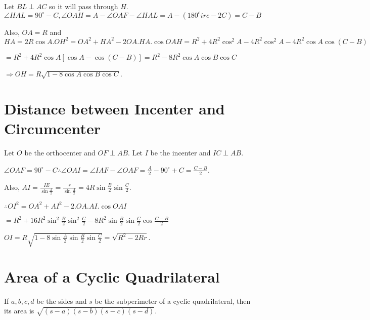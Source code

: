 Let $BL\perp AC$ so it will pass through $H$. $\angle HAL = 90^\circ - C, \angle OAH = A - \angle OAF - \angle HAL = A - (180^circ
- 2C) = C - B$

Also, $OA = R$ and $HA = 2R\cos A. OH^2 = OA^2 + HA^2 - 2OA.HA.\cos OAH = R^2 + 4R^2\cos^2A - 4R^2\cos^2A - 4R^2\cos A\cos(C - B)$

$= R^2 + 4R^2\cos A[\cos A - \cos(C - B)] = R^2 - 8R^2\cos A\cos B\cos C$

$\Rightarrow OH = R\sqrt{1 - 8\cos A\cos B\cos C}$.

\section{Distance between Incenter and Circumcenter}
Let $O$ be the orthocenter and $OF\perp AB$. Let $I$ be the incenter and $IC\perp AB$.

$\angle OAF = 90^\circ - C \therefore \angle OAI = \angle IAF - \angle OAF = \frac{A}{2} - 90^\circ + C = \frac{C - B}{2}$.

Also, $AI = \frac{IE}{\sin\frac{A}{2}} = \frac{r}{\sin\frac{A}{2}} = 4R\sin\frac{B}{2}\sin\frac{C}{2}$.

$\therefore OI^2 = OA^2 + AI^2 - 2.OA.AI.\cos OAI$

$ = R^2 + 16R^2\sin^2\frac{B}{2}\sin^2\frac{C}{2} - 8R^2\sin\frac{B}{2}\sin\frac{C}{2}\cos\frac{C - B}{2}$

$OI = R\sqrt{1 - 8\sin\frac{A}{2}\sin\frac{B}{2}\sin\frac{C}{2}} = \sqrt{R^2 - 2Rr}$.

\section{Area of a Cyclic Quadrilateral}
\starttheorem
{}
  If $a, b, c, d$ be the sides and $s$ be the subperimeter of a cyclic quadrilateral, then its area is $\sqrt{(s - a)(s - b)(s -
    c)(s - d)}$.
\stoptheorem

